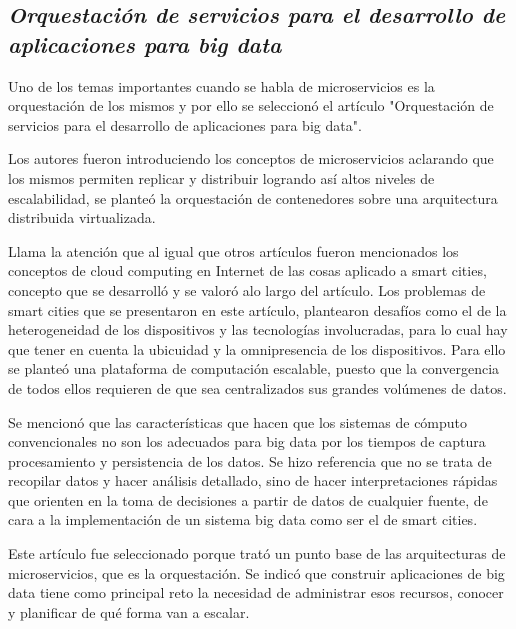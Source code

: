 \subsection{
    \textbf{\emph{Orquestación de servicios para el desarrollo de aplicaciones para big data}}
}

Uno de los temas importantes cuando se habla de microservicios es la orquestación de los mismos y por ello se seleccionó el artículo "Orquestación de servicios para el desarrollo de aplicaciones para big data"\cite{orquestacion}.\par

Los autores fueron introduciendo los conceptos de microservicios aclarando que los mismos permiten replicar y distribuir logrando así altos niveles de escalabilidad, se planteó la orquestación de contenedores sobre una arquitectura distribuida virtualizada.\par

Llama la atención que al igual que otros artículos fueron mencionados los conceptos de cloud computing en Internet de las cosas aplicado a smart cities, concepto que se desarrolló y se valoró alo largo del artículo. Los problemas de smart cities que se presentaron en este artículo, plantearon desafíos como el de la heterogeneidad de los dispositivos y las tecnologías involucradas, para lo cual hay que tener en cuenta la ubicuidad y la omnipresencia de los dispositivos.
Para ello se planteó una plataforma de computación escalable, puesto que la convergencia de todos ellos requieren de que sea centralizados sus grandes  volúmenes de datos.\par

Se mencionó que las características que hacen que los sistemas de cómputo convencionales no son los adecuados para big data por los tiempos de captura procesamiento y persistencia de los datos. Se hizo referencia que no se trata de recopilar datos y hacer análisis detallado, sino de hacer interpretaciones rápidas que orienten en la toma de decisiones a partir de datos de cualquier fuente, de cara a la implementación de un sistema big data como ser el de smart cities.\par

Este artículo fue seleccionado porque trató un punto base de las arquitecturas de microservicios, que es la orquestación. Se indicó que construir aplicaciones de big data tiene como principal reto la necesidad de administrar esos recursos, conocer y planificar de qué forma van a escalar.\par


